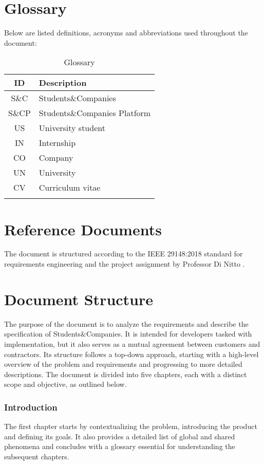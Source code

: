 \section{Glossary}
Below are listed definitions, acronyms and abbreviations used throughout the document:

\renewcommand{\arraystretch}{1.5}
\begin{longtable}{|c|p{8.5cm}|}
    \hline \rowcolor{polimiblue!40}
    \textbf{ID} & \textbf{Description} \\ \hline
    S\&C & Students\&Companies \\ \hline
    S\&CP & Students\&Companies Platform \\ \hline
    US & University student \\ \hline
    IN & Internship \\ \hline
    CO & Company \\ \hline
    UN & University \\ \hline
    CV & Curriculum vitae \\ \hline
\caption{Glossary}
\end{longtable}

\section{Reference Documents}
The document is structured according to the IEEE 29148:2018 standard for requirements engineering \cite{ieee2018} and the project assignment by Professor Di Nitto \cite{project2024}.

\section{Document Structure}
The purpose of the document is to analyze the requirements and describe the specification of Students\&Companies.
It is intended for developers tasked with implementation, but it also serves as a mutual agreement between customers and contractors.
Its structure follows a top-down approach, starting with a high-level overview of the problem and requirements and progressing to more detailed descriptions.
The document is divided into five chapters, each with a distinct scope and objective, as outlined below.

\subsubsection{Introduction}
The first chapter starts by contextualizing the problem, introducing the product and defining its goals.
It also provides a detailed list of global and shared phenomena and concludes with a glossary essential for understanding the subsequent chapters.


